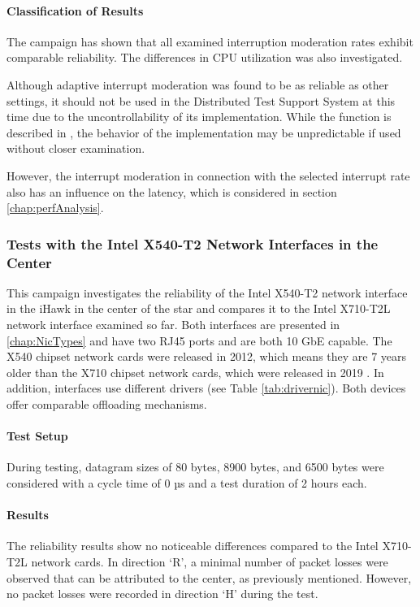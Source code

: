 \paragraph{Classification of Results}
The campaign has shown that all examined interruption moderation rates exhibit comparable reliability. The differences in CPU utilization was also investigated.

Although adaptive interrupt moderation was found to be as reliable as other settings, it should not be used in the Distributed Test Support System at this time due to the uncontrollability of its implementation. While the function is described in \cite{intermod04}, the behavior of the implementation may be unpredictable if used without closer examination.

However, the interrupt moderation in connection with the selected interrupt rate also has an influence on the latency, which is considered in section \ref{chap:perfAnalysis}.

\subsubsection{Tests with the Intel X540-T2 Network Interfaces in the Center} \label{chap:IntelRel540}
This campaign investigates the reliability of the Intel X540-T2 network interface in the iHawk in the center of the star and compares it to the Intel X710-T2L network interface examined so far. Both interfaces are presented in \ref{chap:NicTypes} and have two RJ45 ports and are both 10 GbE capable. The X540 chipset network cards were released in 2012, which means they are 7 years older than the X710 chipset network cards, which were released in 2019 \cite{setupnw02, setupnw03}. In addition, interfaces use different drivers (see Table \ref{tab:drivernic}). Both devices offer comparable offloading mechanisms.

\paragraph{Test Setup}
During testing, datagram sizes of 80 bytes, 8900 bytes, and 6500 bytes were considered with a cycle time of 0 µs and a test duration of 2 hours each.

\paragraph{Results}
The reliability results show no noticeable differences compared to the Intel X710-T2L network cards. In direction `R', a minimal number of packet losses were observed that can be attributed to the center, as previously mentioned. However, no packet losses were recorded in direction `H' during the test.

